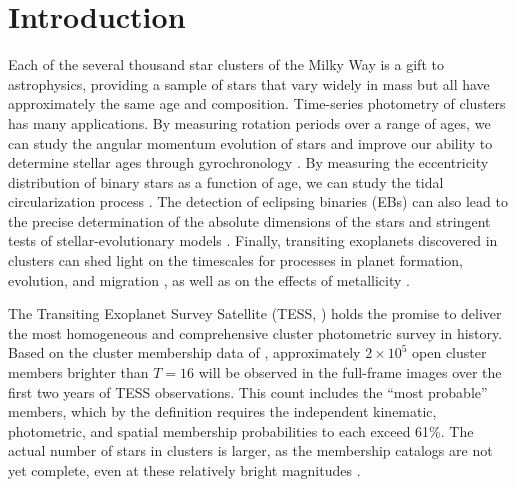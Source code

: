 \documentclass[12pt,twocolumn,tighten]{aastex62}
\begin{document}



\section{Introduction}
\label{sec:intro}

Each of the several thousand star clusters of the Milky Way is a gift
to astrophysics, providing a sample of stars that vary widely in mass
but all have approximately the same age and composition.  Time-series
photometry of clusters has many applications. By measuring rotation
periods over a range of ages, we can study the angular momentum
evolution of stars and improve our ability to determine stellar ages
through gyrochronology \citep[{\it
e.g.},][]{skumanich_time_1972,barnes_color-period_2015,meibom_spin-down_2015,curtis_tess_2019}.
By measuring the eccentricity distribution of binary stars as a
function of age, we can study the tidal circularization process
\citep{meibom_robust_2005,milliman_wiyn_2014,price-whelan_binary_2018}.
The detection of eclipsing binaries (EBs) can also lead to the precise
determination of the absolute dimensions of the stars and stringent
tests of stellar-evolutionary models
\citep{luhman_formation_2012,stassun_review_2014,kraus_mass-radius_2015}.
Finally, transiting exoplanets discovered in clusters can shed light
on the timescales for processes in planet formation, evolution, and
migration
\citep[][]{Fortney_et_al_2007,Mann_K2_33b_2016,David_et_al_2017}, as
well as on the effects of metallicity
\citep[][]{fischer_planet-metallicity_2005,petigura_metallicity_2018}.

The Transiting Exoplanet Survey Satellite (TESS,
\citealt{ricker_transiting_2015}) holds the promise to deliver the
most homogeneous and comprehensive cluster photometric survey in
history.  Based on the cluster membership data of
\citet{Kharchenko_et_al_2013}, approximately $2\times10^5$ open
cluster members brighter than $T=16$ will be observed in the
full-frame images over the first two years of TESS observations.  This
count includes the ``most probable'' members, which by the
\citet{kharchenko_global_2012} definition requires the independent
kinematic, photometric, and spatial membership probabilities to each
exceed 61\%.  The actual number of stars in clusters is larger, as the
membership catalogs are not yet complete, even at these relatively
bright magnitudes \citep[{\it
e.g.},][]{roser_nine_RSG_2016,cantat-gaudin_gaia_2018,cantat-gaudin_newOCs_2019,kounkel_untangling_2019,sim_open_2019}.
\end{document}
